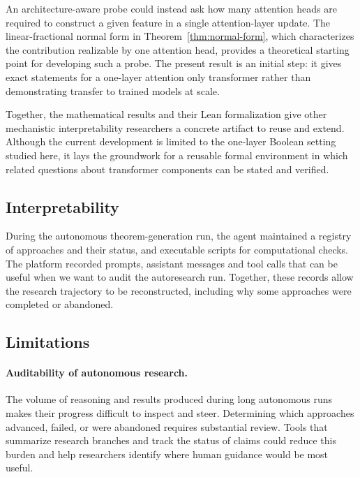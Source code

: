 \documentclass{article}
\theoremstyle{definition}
\theoremstyle{plain}
\begin{document}
An architecture-aware probe could instead ask how many attention heads are required to construct a given feature in a single attention-layer update. The linear-fractional normal form in Theorem~\ref{thm:normal-form}, which characterizes the contribution realizable by one attention head, provides a theoretical starting point for developing such a probe. The present result is an initial step: it gives exact statements for a one-layer attention only transformer rather than demonstrating transfer to trained models at scale.

Together, the mathematical results and their Lean formalization give other mechanistic interpretability researchers a concrete artifact to reuse and extend. Although the current development is limited to the one-layer Boolean setting studied here, it lays the groundwork for a reusable formal environment in which related questions about transformer components can be stated and verified.


\subsection{Interpretability}


During the autonomous theorem-generation run, the agent maintained a registry of approaches and their status, and executable scripts for computational checks. The platform recorded prompts, assistant messages and tool calls that can be useful when we want to audit the autoresearch run. Together, these records allow the research trajectory to be reconstructed, including why some approaches were completed or abandoned.

\subsection{Limitations}


\paragraph{Auditability of autonomous research.}
The volume of reasoning and results produced during long autonomous runs makes their progress difficult to inspect and steer. Determining which approaches advanced, failed, or were abandoned requires substantial review. Tools that summarize research branches and track the status of claims could reduce this burden and help researchers identify where human guidance would be most useful.
\end{document}
